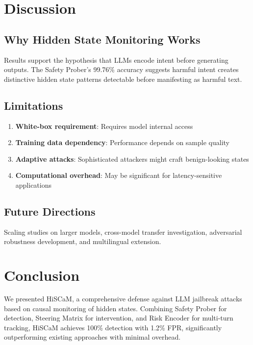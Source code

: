 \documentclass[10pt,twocolumn]{article}
\newcommand{\method}{HiSCaM}  %
\begin{document}
\section{Discussion}

\subsection{Why Hidden State Monitoring Works}

Results support the hypothesis that LLMs encode intent before generating outputs. The Safety Prober's 99.76\% accuracy suggests harmful intent creates distinctive hidden state patterns detectable before manifesting as harmful text.

\subsection{Limitations}

\begin{enumerate}
\item \textbf{White-box requirement}: Requires model internal access
\item \textbf{Training data dependency}: Performance depends on sample quality
\item \textbf{Adaptive attacks}: Sophisticated attackers might craft benign-looking states
\item \textbf{Computational overhead}: May be significant for latency-sensitive applications
\end{enumerate}

\subsection{Future Directions}

Scaling studies on larger models, cross-model transfer investigation, adversarial robustness development, and multilingual extension.

\section{Conclusion}

We presented \method{}, a comprehensive defense against LLM jailbreak attacks based on causal monitoring of hidden states. Combining Safety Prober for detection, Steering Matrix for intervention, and Risk Encoder for multi-turn tracking, \method{} achieves 100\% detection with 1.2\% FPR, significantly outperforming existing approaches with minimal overhead.
\end{document}
